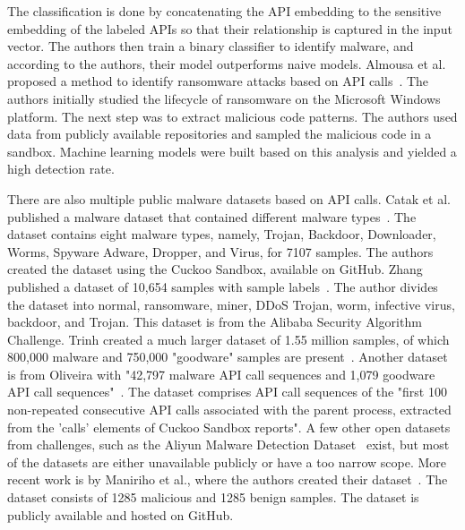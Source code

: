 The classification is done by concatenating the API embedding to the sensitive embedding of the labeled APIs so that their relationship is captured in the input vector.
The authors then train a binary classifier to identify malware, and according to the authors, their model outperforms naive models.
Almousa et al. proposed a method to identify ransomware attacks based on API calls~\cite {almousa2021api}. The authors initially studied the lifecycle of ransomware on the Microsoft Windows platform. The next step was to extract malicious code patterns. The authors used data from publicly available repositories and sampled the malicious code in a sandbox. Machine learning models were built based on this analysis and yielded a high detection rate.

There are also multiple public malware datasets based on API calls.
Catak et al. published a malware dataset that contained different malware types~\cite{catak2019benchmark}. The dataset contains eight malware types, namely, Trojan, Backdoor, Downloader, Worms, Spyware Adware, Dropper, and Virus, for 7107 samples. 
The authors created the dataset using the Cuckoo Sandbox, available on GitHub.
Zhang published a dataset of 10,654 samples with sample labels~\cite{zhang22}.
The author divides the dataset into normal, ransomware, miner, DDoS Trojan, worm, infective virus, backdoor, and Trojan.
This dataset is from the Alibaba Security Algorithm Challenge.
Trinh created a much larger dataset of 1.55 million samples, of which 800,000 malware and 750,000 "goodware" samples are present~\cite{trinh21}.
Another dataset is from Oliveira with "42,797 malware API call sequences and 1,079 goodware API call sequences"~\cite{de2023behavioral}.
The dataset comprises API call sequences of the "first 100 non-repeated consecutive API calls associated with the parent process, extracted from the 'calls' elements of Cuckoo Sandbox reports".
A few other open datasets from challenges, such as the Aliyun Malware Detection Dataset~\cite{tianchi2016} exist, but most of the datasets are either unavailable publicly or have a too narrow scope.
More recent work is by Maniriho et al., where the authors created their dataset~\cite{maniriho2023api}. The dataset consists of 1285 malicious and 1285 benign samples. The dataset is publicly available and hosted on GitHub.